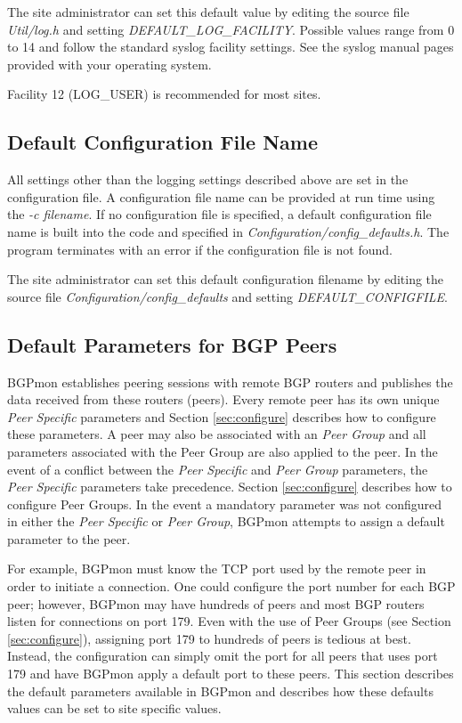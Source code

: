 The site administrator can set this default value by editing the source file \emph{Util/log.h} and setting \emph{DEFAULT\_LOG\_FACILITY}.     Possible values range from 0 to 14 and follow the standard syslog facility settings.    See the syslog manual pages provided with your operating system.   

Facility 12 (LOG\_USER) is recommended for most sites. 

\subsection{Default Configuration File Name}
\label{sec:custom:config}

All settings other than the logging settings described above are set in the configuration file.   A configuration file name can be provided at run time using the \emph{-c filename}.  If no configuration file is specified, a default configuration file name is built into the code and specified in \emph{Configuration/config\_defaults.h}.   The program terminates with an error if the configuration file is not found.     

The site administrator can set this default configuration filename by editing the source file \emph{Configuration/config\_defaults} and setting \emph{DEFAULT\_CONFIGFILE}.  

\subsection{Default Parameters for BGP Peers}
\label{sec:custom:peer}

BGPmon establishes peering sessions with remote BGP routers and publishes the data received from these routers (peers).    Every remote peer has its own unique \emph{Peer Specific} parameters and Section \ref{sec:configure} describes how to configure these parameters.   A peer may also be associated with an \emph{Peer Group} and all parameters associated with the Peer Group are also applied to the peer.    In the event of a conflict between the \emph{Peer Specific} and \emph{Peer Group} parameters, the \emph{Peer Specific} parameters take precedence.   Section \ref{sec:configure} describes how to configure Peer Groups.  In the event a mandatory parameter was not configured in either the \emph{Peer Specific} or \emph{Peer Group}, BGPmon attempts to assign a default parameter to the peer.    

For example, BGPmon must know the TCP port used by the remote peer in order to initiate a connection.   One could configure the port number for each BGP peer; however,  BGPmon may have hundreds of peers and most BGP routers listen for connections on port 179.   Even with the use of Peer Groups (see Section \ref{sec:configure}), assigning port 179 to hundreds of peers is tedious at best.      Instead, the configuration can simply omit the port for all peers that uses port 179 and have BGPmon apply a default port to these peers.     This section describes the default parameters available in BGPmon and describes how these defaults values can be set to site specific values.

